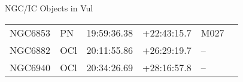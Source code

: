 \begin{block}{NGC/IC Objects in Vul}
  \centering
  \begin{tabularx}{\textwidth}{llrrll} 
    NGC6853 & PN & 19:59:36.38 & +22:43:15.7  & M027 \\ 
    NGC6882 & OCl & 20:11:55.86 & +26:29:19.7  & -- \\ 
    NGC6940 & OCl & 20:34:26.69 & +28:16:57.8  & -- \\ 
  \end{tabularx}
\end{block}